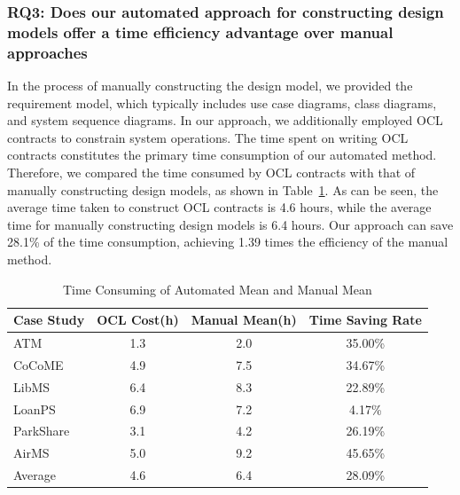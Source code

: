\documentclass[pdflatex,sn-mathphys-num]{sn-jnl}%
\theoremstyle{thmstyleone}%
\theoremstyle{thmstyletwo}%
\theoremstyle{thmstylethree}%
\begin{document}
\subsubsection{\textbf{RQ3:} Does our automated approach for constructing design models offer a time efficiency advantage over manual approaches}
In the process of manually constructing the design model, we provided the requirement model, which typically includes use case diagrams, class diagrams, and system sequence diagrams. In our approach, we additionally employed OCL contracts to constrain system operations. The time spent on writing OCL contracts constitutes the primary time consumption of our automated method. Therefore, we compared the time consumed by OCL contracts with that of manually constructing design models, as shown in Table~\ref{tab:time-comparison}. As can be seen, the average time taken to construct OCL contracts is 4.6 hours, while the average time for manually constructing design models is 6.4 hours. Our approach can save 28.1\% of the time consumption, achieving 1.39 times the efficiency of the manual method.
\begin{table}[!htb]
  \caption{Time Consuming of Automated Mean and Manual Mean}
  \label{tab:time-comparison}
  \centering
  \begin{threeparttable}
  \begin{tabular}{lccc}
    \toprule
    Case Study & OCL Cost(h) & Manual Mean(h) & Time Saving Rate \\
    \midrule
    ATM       & 1.3                     & 2.0                      & 35.00\% \\
    CoCoME    & 4.9                     & 7.5                     & 34.67\% \\
    LibMS     & 6.4                     & 8.3                     & 22.89\% \\
    LoanPS    & 6.9                     & 7.2                     & 4.17\%  \\
    ParkShare & 3.1                     & 4.2                     & 26.19\% \\
    AirMS     & 5.0                     & 9.2                     & 45.65\% \\
    \midrule
    Average & 4.6 & 6.4 & 28.09\% \\
  \bottomrule
  \end{tabular}
  \end{threeparttable}
\end{table}
\end{document}
